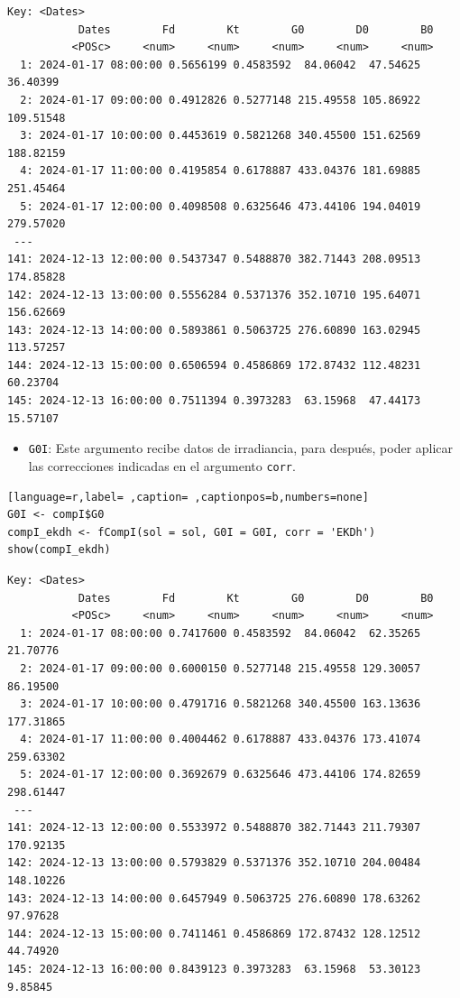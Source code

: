 \begin{itemize}
\begin{verbatim}
Key: <Dates>
		   Dates        Fd        Kt        G0        D0        B0
		  <POSc>     <num>     <num>     <num>     <num>     <num>
  1: 2024-01-17 08:00:00 0.5656199 0.4583592  84.06042  47.54625  36.40399
  2: 2024-01-17 09:00:00 0.4912826 0.5277148 215.49558 105.86922 109.51548
  3: 2024-01-17 10:00:00 0.4453619 0.5821268 340.45500 151.62569 188.82159
  4: 2024-01-17 11:00:00 0.4195854 0.6178887 433.04376 181.69885 251.45464
  5: 2024-01-17 12:00:00 0.4098508 0.6325646 473.44106 194.04019 279.57020
 ---                                                                      
141: 2024-12-13 12:00:00 0.5437347 0.5488870 382.71443 208.09513 174.85828
142: 2024-12-13 13:00:00 0.5556284 0.5371376 352.10710 195.64071 156.62669
143: 2024-12-13 14:00:00 0.5893861 0.5063725 276.60890 163.02945 113.57257
144: 2024-12-13 15:00:00 0.6506594 0.4586869 172.87432 112.48231  60.23704
145: 2024-12-13 16:00:00 0.7511394 0.3973283  63.15968  47.44173  15.57107
\end{verbatim}

\begin{itemize}
\item \texttt{G0I}: Este argumento recibe datos de irradiancia, para después, poder aplicar las correcciones indicadas en el argumento \texttt{corr}.
\end{itemize}
\begin{lstlisting}[language=r,label= ,caption= ,captionpos=b,numbers=none]
G0I <- compI$G0
compI_ekdh <- fCompI(sol = sol, G0I = G0I, corr = 'EKDh')
show(compI_ekdh)
\end{lstlisting}

\begin{verbatim}
Key: <Dates>
		   Dates        Fd        Kt        G0        D0        B0
		  <POSc>     <num>     <num>     <num>     <num>     <num>
  1: 2024-01-17 08:00:00 0.7417600 0.4583592  84.06042  62.35265  21.70776
  2: 2024-01-17 09:00:00 0.6000150 0.5277148 215.49558 129.30057  86.19500
  3: 2024-01-17 10:00:00 0.4791716 0.5821268 340.45500 163.13636 177.31865
  4: 2024-01-17 11:00:00 0.4004462 0.6178887 433.04376 173.41074 259.63302
  5: 2024-01-17 12:00:00 0.3692679 0.6325646 473.44106 174.82659 298.61447
 ---                                                                      
141: 2024-12-13 12:00:00 0.5533972 0.5488870 382.71443 211.79307 170.92135
142: 2024-12-13 13:00:00 0.5793829 0.5371376 352.10710 204.00484 148.10226
143: 2024-12-13 14:00:00 0.6457949 0.5063725 276.60890 178.63262  97.97628
144: 2024-12-13 15:00:00 0.7411461 0.4586869 172.87432 128.12512  44.74920
145: 2024-12-13 16:00:00 0.8439123 0.3973283  63.15968  53.30123   9.85845
\end{verbatim}


\end{itemize}
